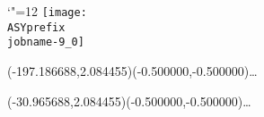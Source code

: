 \setlength{\unitlength}{1pt}%
\makeatletter%
\let\ASYencoding\f@encoding%
\let\ASYfamily\f@family%
\let\ASYseries\f@series%
\let\ASYshape\f@shape%
\makeatother%
{\catcode`"=12%
\texttt{[image: \\ASYprefix\\jobname-9\_0]}%
}%
%
\fontsize{12.000000}{14.400000}\selectfont%
\usefont{\ASYencoding}{\ASYfamily}{\ASYseries}{\ASYshape}%
\ASYalign(-197.186688,2.084455)(-0.500000,-0.500000){\ldots}%
%
\fontsize{12.000000}{14.400000}\selectfont%
\ASYalign(-30.965688,2.084455)(-0.500000,-0.500000){\ldots}%
